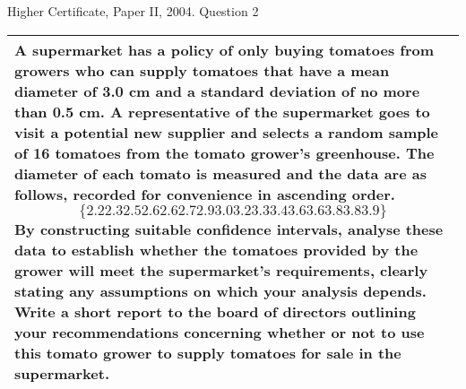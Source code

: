 \documentclass[a4paper,12pt]{article}
\begin{document}
Higher Certificate, Paper II, 2004. Question 2

 
\begin{table}[ht!]
 
\centering
 
\begin{tabular}{|p{15cm}|}
 
\hline  

A supermarket has a policy of only buying tomatoes from growers who can supply tomatoes that have a mean diameter of 3.0 cm and a standard 
deviation of no more than 0.5 cm.  A representative of the supermarket goes to visit a potential new supplier and selects a random sample of 
16 tomatoes from the tomato grower's greenhouse.  The diameter of each tomato is measured and the data are as follows, recorded for convenience in ascending order. 
    \[\{2.2   2.3   2.5   2.6   2.6   2.7   2.9   3.0   3.2   3.3   3.4   3.6   3.6   3.8   3.8   3.9 \}\]
By constructing suitable confidence intervals, analyse these data to establish whether the tomatoes provided by the grower 
will meet the supermarket's requirements, clearly stating any assumptions on which your analysis depends.  
Write a short report to the board of directors outlining your recommendations concerning whether or not to use this 
tomato grower to supply tomatoes for sale in the supermarket.  
\\ \hline
  
\end{tabular}

\end{table} 
 
\end{document}
